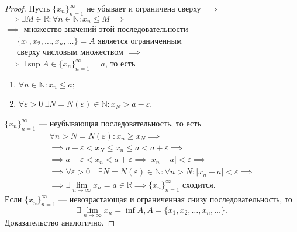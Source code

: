 \documentclass[a4paper,12pt]{article} %
\theoremstyle{remark}
\begin{document}
\begin{proof}
	Пусть $\{x_n\}_{n=1}^{\infty}$ не убывает и ограничена сверху $\implies$ \\
	$\implies \exists M\in \mathbb{R} :\forall n\in \mathbb{N}:x_{n}\le M\implies$ \\
	\indent $\implies$ множество значений этой последовательности \\
	\indent \indent \ \ \ $\{x_1, x_2,\ldots, x_{n}, \ldots\}=A$ является ограниченным \\ 
	\indent \indent \ \ \ сверху числовым множеством $\implies$ \\
	\indent \indent \indent \indent \indent \indent $\implies \exists \sup A\in \{x_n\}_{n=1}^{\infty}=a$, то есть
	\begin{enumerate}
		\item $\forall n\in \mathbb{N}:x_{n}\le a$;
		\item $\forall \varepsilon>0 \ \exists N=N(\varepsilon)\in \mathbb{N}:x_{N}>a-\varepsilon$.
	\end{enumerate}

\begin{center}
\end{center}
$\{x_n\}_{n=1}^{\infty}$ --- неубывающая последовательность, то есть 
\begin{multline}
\forall n>N=N(\varepsilon):x_{n}\ge x_N \implies \\
\implies a-\varepsilon<x_N\le x_{n}\le a<a+\varepsilon\implies \\
\implies a-\varepsilon<x_{n}<a+\varepsilon \implies |x_{n}-a|<\varepsilon \implies \\
\implies \forall \varepsilon>0 \quad \exists N=N(\varepsilon)\in \mathbb{N}:\forall n>N:|x_{n}-a|<\varepsilon \implies \\
\implies \exists \lim_{n \to \infty}x_{n} = a\in \mathbb{R} \implies \{x_n\}_{n=1}^{\infty} \text{ сходится.}
\end{multline}
Если $\{x_n\}_{n=1}^{\infty}$ --- невозрастающая и ограниченная снизу последовательность, то 
\[
\exists \lim_{n \to \infty} x_{n}=\inf A, A = \{x_1, x_2, \ldots, x_{n}, \ldots\} 
.\] 
Доказательство аналогично.
\end{proof}
\end{document}
